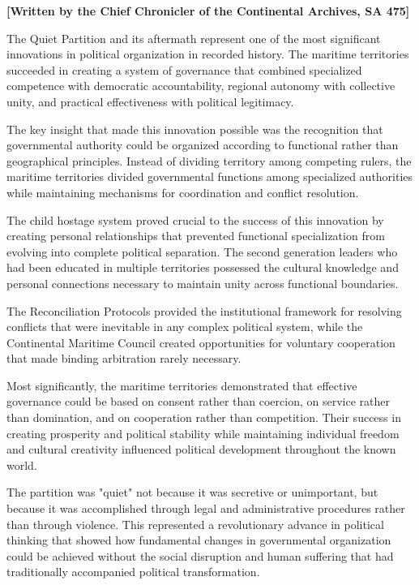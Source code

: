 \textbf{{[}Written by the Chief Chronicler of the Continental Archives,
SA 475{]}}

The Quiet Partition and its aftermath represent one of the most
significant innovations in political organization in recorded history.
The maritime territories succeeded in creating a system of governance
that combined specialized competence with democratic accountability,
regional autonomy with collective unity, and practical effectiveness
with political legitimacy.

The key insight that made this innovation possible was the recognition
that governmental authority could be organized according to functional
rather than geographical principles. Instead of dividing territory among
competing rulers, the maritime territories divided governmental
functions among specialized authorities while maintaining mechanisms for
coordination and conflict resolution.

The child hostage system proved crucial to the success of this
innovation by creating personal relationships that prevented functional
specialization from evolving into complete political separation. The
second generation leaders who had been educated in multiple territories
possessed the cultural knowledge and personal connections necessary to
maintain unity across functional boundaries.

The Reconciliation Protocols provided the institutional framework for
resolving conflicts that were inevitable in any complex political
system, while the Continental Maritime Council created opportunities for
voluntary cooperation that made binding arbitration rarely necessary.

Most significantly, the maritime territories demonstrated that effective
governance could be based on consent rather than coercion, on service
rather than domination, and on cooperation rather than competition.
Their success in creating prosperity and political stability while
maintaining individual freedom and cultural creativity influenced
political development throughout the known world.

The partition was "quiet" not because it was secretive or unimportant,
but because it was accomplished through legal and administrative
procedures rather than through violence. This represented a
revolutionary advance in political thinking that showed how fundamental
changes in governmental organization could be achieved without the
social disruption and human suffering that had traditionally accompanied
political transformation.

